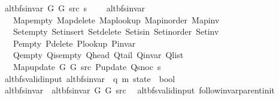 \begin{isabellebody}
\ \ {\isachardoublequoteopen}alt{\isacharunderscore}{\kern0pt}bfs{\isacharunderscore}{\kern0pt}invar{\isacharprime}{\kern0pt}\ G{}\ G{}\ src\ s\ {\isasymequiv}\isanewline
\ \ \ alt{\isacharunderscore}{\kern0pt}bfs{\isacharunderscore}{\kern0pt}invar\isanewline
\ \ \ \ Map{\isacharunderscore}{\kern0pt}empty\ Map{\isacharunderscore}{\kern0pt}delete\ Map{\isacharunderscore}{\kern0pt}lookup\ Map{\isacharunderscore}{\kern0pt}inorder\ Map{\isacharunderscore}{\kern0pt}inv\isanewline
\ \ \ \ Set{\isacharunderscore}{\kern0pt}empty\ Set{\isacharunderscore}{\kern0pt}insert\ Set{\isacharunderscore}{\kern0pt}delete\ Set{\isacharunderscore}{\kern0pt}isin\ Set{\isacharunderscore}{\kern0pt}inorder\ Set{\isacharunderscore}{\kern0pt}inv\isanewline
\ \ \ \ P{\isacharunderscore}{\kern0pt}empty\ P{\isacharunderscore}{\kern0pt}delete\ P{\isacharunderscore}{\kern0pt}lookup\ P{\isacharunderscore}{\kern0pt}invar\isanewline
\ \ \ \ Q{\isacharunderscore}{\kern0pt}empty\ Q{\isacharunderscore}{\kern0pt}is{\isacharunderscore}{\kern0pt}empty\ Q{\isacharunderscore}{\kern0pt}head\ Q{\isacharunderscore}{\kern0pt}tail\ Q{\isacharunderscore}{\kern0pt}invar\ Q{\isacharunderscore}{\kern0pt}list\isanewline
\ \ \ \ Map{\isacharunderscore}{\kern0pt}update\ G{}\ G{}\ src\ P{\isacharunderscore}{\kern0pt}update\ Q{\isacharunderscore}{\kern0pt}snoc\ s{\isachardoublequoteclose}\isanewline
\isanewline
{}\isamarkupfalse%
\ {\isacharparenleft}{\kern0pt}\ alt{\isacharunderscore}{\kern0pt}bfs{\isacharunderscore}{\kern0pt}valid{\isacharunderscore}{\kern0pt}input{\isacharparenright}{\kern0pt}\ alt{\isacharunderscore}{\kern0pt}bfs{\isacharunderscore}{\kern0pt}invar{\isacharprime}{\kern0pt}{\isacharprime}{\kern0pt}\ {\isacharcolon}{\kern0pt}{\isacharcolon}{\kern0pt}\ {\isachardoublequoteopen}{\isacharparenleft}{\kern0pt}{\isacharprime}{\kern0pt}q{\isacharcomma}{\kern0pt}\ {\isacharprime}{\kern0pt}m{\isacharparenright}{\kern0pt}\ state\ {\isasymRightarrow}\ bool{\isachardoublequoteclose}\ \isanewline
\ \ {\isachardoublequoteopen}alt{\isacharunderscore}{\kern0pt}bfs{\isacharunderscore}{\kern0pt}invar{\isacharprime}{\kern0pt}{\isacharprime}{\kern0pt}\ {\isasymequiv}\ alt{\isacharunderscore}{\kern0pt}bfs{\isacharunderscore}{\kern0pt}invar{\isacharprime}{\kern0pt}\ G{}\ G{}\ src{\isachardoublequoteclose}\isanewline
\isanewline
{}\isamarkupfalse%
\ {\isacharparenleft}{\kern0pt}\ alt{\isacharunderscore}{\kern0pt}bfs{\isacharunderscore}{\kern0pt}valid{\isacharunderscore}{\kern0pt}input{\isacharparenright}{\kern0pt}\ follow{\isacharunderscore}{\kern0pt}invar{\isacharunderscore}{\kern0pt}parent{\isacharunderscore}{\kern0pt}init{\isacharcolon}{\kern0pt}\isanewline

\end{isabellebody}

